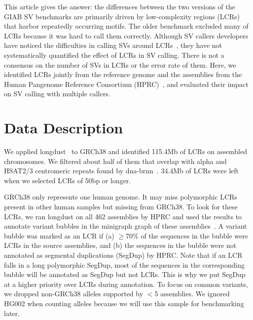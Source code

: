 \documentclass[a4paper,num-refs]{oup-contemporary}
\begin{document}
This article gives the answer:
the differences between the two versions of the GIAB SV benchmarks
are primarily driven by low-complexity regions (LCRs) that harbor repeatedly occurring motifs.
The older benchmark excluded many of LCRs because it was hard to call them correctly.
Although SV callers developers have noticed the difficulties in calling SVs around LCRs~\cite{Zook:2020aa,Smolka:2024ab,Keskus:2025aa},
they have not systematically quantified the effect of LCRs in SV calling.
There is not a consensus on the number of SVs in LCRs or the error rate of them.
Here, we identified LCRs jointly from the reference genome
and the assemblies from the Human Pangenome Reference Consortium (HPRC)~\cite{Liao:2023aa},
and evaluated their impact on SV calling with multiple callers.


\section{Data Description}


We applied longdust~\cite{Li:2025aa} to GRCh38 and identified 115.4Mb of LCRs on assembled chromosomes.
We filtered about half of them that overlap with alpha and HSAT2/3 centromeric repeats found by dna-brnn~\cite{Li:2019aa}.
34.4Mb of LCRs were left when we selected LCRs of 50bp or longer.

GRCh38 only represents one human genome.
It may miss polymorphic LCRs present in other human samples but missing from GRCh38.
To look for these LCRs, we ran longdust on all 462 assemblies by HPRC
and used the results to annotate variant bubbles in the minigraph graph of these assemblies~\cite{Li:2020aa}.
A variant bubble was marked as an LCR if (a) $\ge$70\% of the sequences in the bubble were LCRs in the source assemblies, and
(b) the sequences in the bubble were not annotated as segmental duplications (SegDup) by HPRC.
Note that if an LCR falls in a long polymorphic SegDup, most of the sequences in the corresponding bubble will be annotated as SegDup but not LCRs.
This is why we put SegDup at a higher priority over LCRs during annotation.
To focus on common variants, we dropped non-GRCh38 alleles supported by $<$5 assemblies.
We ignored HG002 when counting alleles because we will use this sample for benchmarking later.
\end{document}
